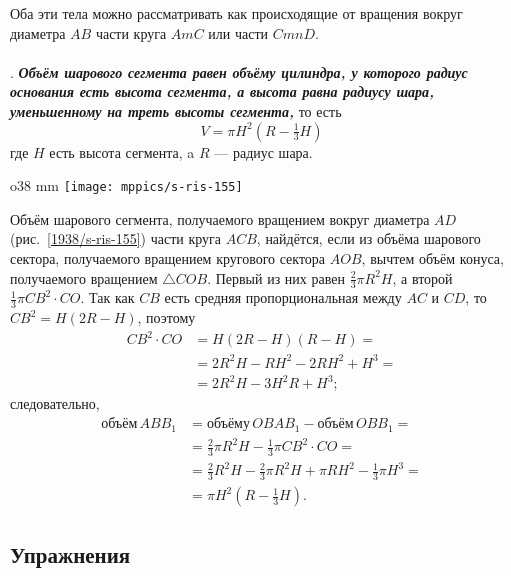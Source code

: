 Оба эти тела можно рассматривать как происходящие от вращения вокруг диаметра $AB$ части круга $AmC$ или части $CmnD$.

\paragraph{}\label{1938/s149}
\mbox{.}
\textbf{\emph{Объём шарового сегмента равен объёму цилиндра, у которого радиус основания есть высота сегмента, а высота равна радиусу шара, уменьшенному на треть высоты сегмента,}} то есть
\[ V = \pi H^2(R-\tfrac13 H)\]
где $H$ есть высота сегмента, a $R$ — радиус шара.


\begin{wrapfigure}{o}{38 mm}
\vskip-0mm
\centering
\texttt{[image: mppics/s-ris-155]}
\caption{}\label{1938/s-ris-155}
\vskip-0mm
\end{wrapfigure}

Объём шарового сегмента, получаемого вращением вокруг диаметра $AD$ (рис.~\ref{1938/s-ris-155}) части круга $ACB$, найдётся, если из объёма шарового сектора, получаемого вращением кругового сектора $AOB$, вычтем объём конуса, получаемого вращением $\triangle COB$.
Первый из них равен $\tfrac23\pi R^2H$, а второй $\tfrac13\pi CB^2\cdot CO$.
Так как $CB$ есть средняя пропорциональная между $AC$ и $CD$, то $CB^2 = H(2R - H)$, поэтому
\begin{align*}
CB^2\cdot CO &= H(2R - H)(R - H)=
\\
&=2R^2H - RH^2 - 2RH^2 + H^3 =
\\
&= 2R^2H-3H^2R + H^3;
\end{align*}
следовательно, 
\begin{align*}
\text{объём}\, ABB_1
&= \text{объёму}\, OBAB_1- \text{объём}\, OBB_1=
\\
&=\tfrac23\pi R^2H -\tfrac13 \pi CB^2\cdot CO = 
\\
&=\tfrac23 R^2H - \tfrac23\pi R^2H + \pi RH^2 - \tfrac13\pi H^3 = 
\\
&= \pi H^2(R-\tfrac13H).
\end{align*}

\subsection*{Упражнения}

